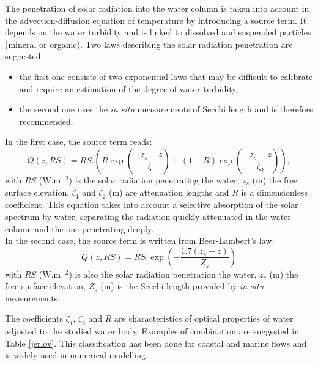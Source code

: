 The penetration of solar radiation into the water column is taken into account
in the advection-diffusion equation of temperature by introducing a source
term. It depends on the water turbidity and is linked to dissolved and
suspended particles (mineral or organic). Two laws describing the solar
radiation penetration are suggested:
\begin{itemize}
\item the first one consists of two exponential laws that may be difficult to
calibrate and require an estimation of the degree of water turbidity,
\item the second one uses the \emph{in situ} measurements of Secchi length and
is therefore recommended.
\end{itemize}
In the first case, the source term reads:
\begin{equation}
Q(z,RS) = RS.\left(  R \exp\left(  -\dfrac{z_{s}-z}{\zeta_{1}} \right)  + (1-R)
\exp\left(  -\dfrac{z_{s}-z}{\zeta_{2}} \right)  \right)  ,
\end{equation}
with $RS$ ($\mathrm{{W}.m^{-2}}$) is the solar radiation penetrating the
water, $z_{s}$ (m) the free surface elevation, $\zeta_{1}$ and $\zeta_{2}$ (m)
are attenuation lengths and $R$ is a dimensionless coefficient.
This equation takes into account a selective
absorption of the solar spectrum by water, separating the radiation quickly
attenuated in the water column and the one penetrating deeply.\\

In the second case, the source term is written from Beer-Lambert's law:
\begin{equation}
Q(z,RS) = RS. \exp\left(  -\dfrac{1.7(z_{s}-z)}{Z_{s}} \right)
\end{equation}
with $RS$ ($\mathrm{{W}.m^{-2}}$) is also the solar radiation penetration the
water, $z_{s}$ (m) the free surface elevation, $Z_{s}$ (m) is the Secchi
length provided by \emph{in situ} measurements.

The coefficients $\zeta_{1}$, $\zeta_{2}$ and $R$ are characteristics of
optical properties of water adjusted to the studied water body.
Examples of combination are suggested in Table \ref{jerlov}. This
classification has been done for coastal and marine flows and is widely used
in numerical modelling.

